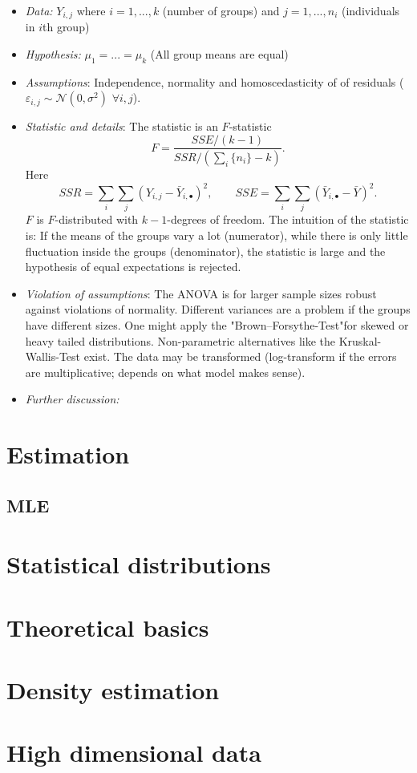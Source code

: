 \documentclass[12pt,a4paper]{amsart}
\theoremstyle{definition}
\theoremstyle{remark}
\numberwithin{equation}{section}
\begin{document}
\begin{itemize}
\item\textit{Data:} $Y_{i,j}$ where $i=1,...,k$ (number of groups) and $j=1,...,n_i$ (individuals in $i$th group)
\item\textit{Hypothesis:}  $\mu_1=...=\mu_k$ (All group means are equal)
\item \textit{Assumptions}: Independence, normality and homoscedasticity of of residuals ($\varepsilon_{i,j } \sim \mathcal{N}(0, \sigma^2) \,\, \forall i,j$).
\item \textit{Statistic and details}: The statistic is an $F$-statistic
$$ F=\frac{SSE/(k-1)}{SSR/(\sum_i \{n_i\}-k)}.$$
Here 
$$SSR= \sum_i \sum_j (Y_{i,j}- \bar Y_{i,\bullet})^2, \quad\quad SSE= \sum_i \sum_j (\bar Y_{i,\bullet}- \bar Y)^2.$$
$F$ is $F$-distributed with $k-1$-degrees of freedom. The intuition of the statistic is: If the means of the groups vary a lot (numerator), while there is only little fluctuation inside the groups (denominator), the statistic is large and the hypothesis of equal expectations is rejected.
\item  \textit{Violation of assumptions}: The ANOVA is for larger sample sizes robust against violations of normality. Different variances are a problem if the groups have different sizes. One might apply the "Brown–Forsythe-Test"for skewed or heavy tailed distributions. Non-parametric alternatives like the  Kruskal-Wallis-Test exist. The data may be transformed (log-transform if the errors are multiplicative; depends on what model makes sense). 
\item \textit{Further discussion:} 
\end{itemize}



\section{Estimation}

\subsection{MLE}

\section{Statistical distributions}



\section{Theoretical basics}



\section{Density estimation}

\section{High dimensional data}



\end{document}
